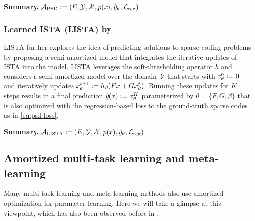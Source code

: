 \documentclass[twoside,11pt]{article}
\begin{document}
\textbf{Summary.}
${\mathcal{A}}_{\rm PSD}\vcentcolon= (E, {\mathcal{Y}}, {\mathcal{X}}, p(x), \hat y_\theta, {\mathcal{L}}_{\rm reg})$

\subsubsection{Learned ISTA (LISTA) by \citet{gregor2010learning}}
LISTA further explores the idea of predicting solutions
to sparse coding problems by proposing a semi-amortized model
that integrates the iterative updates of ISTA into the model.
LISTA leverages the soft-thresholding operator $h$ and
considers a semi-amortized model over the domain ${\mathcal{Y}}$
that starts with $x^0_\theta\vcentcolon= 0$
and iteratively updates $x^{t+1}_\theta\vcentcolon= h_{\beta}(Fx+Gx_\theta^t)$.
Running these updates for $K$ steps results in a
final prediction $\hat y(x)\vcentcolon= x^K_\theta$ parameterized
by $\theta=\{F, G, \beta\}$ that is also optimized with
the regression-based loss to the ground-truth
sparse codes as in \cref{eq:psd-loss}.

\textbf{Summary.}
${\mathcal{A}}_{\rm LISTA}\vcentcolon= (E, {\mathcal{Y}}, {\mathcal{X}}, p(x), \hat y_\theta, {\mathcal{L}}_{\rm reg})$

\subsection{Amortized multi-task learning and meta-learning}
\label{sec:apps:meta}

Many multi-task learning and meta-learning methods also
use amortized optimization for parameter learning.
Here we will take a glimpse at this viewpoint, which has
also been observed before in \citet{shu2017amortized,gordon2018meta}.
\end{document}

